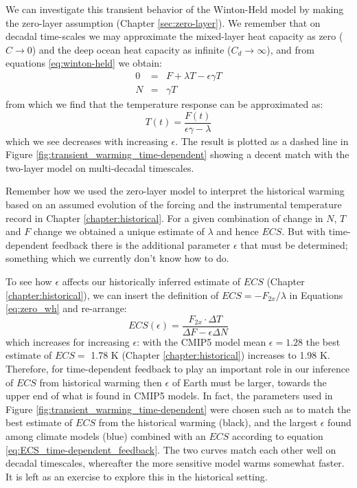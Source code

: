 \documentclass[12pt]{book}
\begin{document}
We can investigate this transient behavior of the Winton-Held model by making the zero-layer assumption (Chapter \ref{sec:zero-layer}). We remember that on decadal time-scales we may approximate the mixed-layer heat capacity as zero ($C\rightarrow 0$) and the deep ocean heat capacity as infinite ($C_d \rightarrow \infty$), and from equations \ref{eq:winton-held} we obtain:
\begin{eqnarray}
0 &=& F + \lambda T- \epsilon\gamma T \label{eq:zero_wh} \\
N &=& \gamma T  \nonumber
\end{eqnarray}
from which we find that the temperature response can be approximated as:
\begin{equation}
T(t) = \frac{F(t)}{\epsilon \gamma - \lambda}
\label{eq:winton-held-zero}
\end{equation}
which we see decreases with increasing $\epsilon$. The result is plotted as a dashed line in Figure \ref{fig:transient_warming_time-dependent} showing a decent match with the two-layer model on multi-decadal timescales.

Remember how we used the zero-layer model to interpret the historical warming based on an assumed evolution of the forcing and the instrumental temperature record in Chapter \ref{chapter:historical}. For a given combination of change in $N$, $T$ and $F$ change we obtained a unique estimate of $\lambda$ and hence $ECS$. But with time-dependent feedback there is the additional parameter $\epsilon$ that must be determined; something which we currently don't know how to do. 

To see how $\epsilon$ affects our historically inferred estimate of $ECS$ (Chapter \ref{chapter:historical}), we can insert the definition of $ECS = -F_{2x}/\lambda$ in Equations \ref{eq:zero_wh} and re-arrange:
\begin{equation}
ECS(\epsilon) = \frac{F_{2x}\cdot \Delta T}{\Delta F -\epsilon\Delta N}
\label{eq:ECS_time-dependent_feedback}
\end{equation} 
which increases for increasing $\epsilon$: with the CMIP5 model mean $\epsilon = 1.28$ the best estimate of $ECS =$ 1.78 K (Chapter \ref{chapter:historical}) increases to 1.98 K. Therefore, for time-dependent feedback to play an important role in our inference of $ECS$ from historical warming then $\epsilon$ of Earth must be larger, towards the upper end of what is found in CMIP5 models. 
In fact, the parameters used in Figure \ref{fig:transient_warming_time-dependent} were chosen such as to match the best estimate of $ECS$ from the historical warming (black), and the largest $\epsilon$ found among climate models (blue) combined with an $ECS$ according to equation \ref{eq:ECS_time-dependent_feedback}. The two curves match each other well on decadal timescales, whereafter the more sensitive model warms somewhat faster. It is left as an exercise to explore this in the historical setting.
\end{document}
